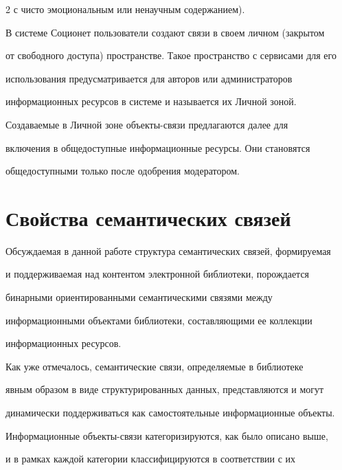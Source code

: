 \begin{multicols}{2}
с чисто эмоциональным или ненаучным содержанием). 


  


  В системе Соционет пользователи создают связи в своем личном (закрытом 


от свободного доступа) пространстве. Такое пространство с сервисами для его 


использования предусматривается для авторов или администраторов 


информационных ресурсов в системе и называется их Личной зоной. 


Создаваемые в Личной зоне объек\-ты-свя\-зи предлагаются далее для 


включения в общедоступные информационные ресурсы. Они становятся 


общедоступными только после одобрения модератором. 





\section{Свойства семантических связей}





  Обсуждаемая в данной работе структура семантических связей, формируемая 


и поддерживаемая над контентом электронной библиотеки, по\-рож\-да\-ет\-ся 


бинарными ориентированными семантическими связями между 


информационными объектами библиотеки, составляющими ее коллекции 


информационных ресурсов. 


  


  Как уже отмечалось, семантические связи, опре\-де\-ля\-емые в библиотеке 


явным образом в виде структурированных данных, представляются и могут 


динамически поддерживаться как самостоятельные информационные объекты. 








Информационные объек\-ты-свя\-зи категоризируются, как было описано выше, 


и в рамках каж\-дой категории классифицируются в соответствии с их 



\end{multicols}

